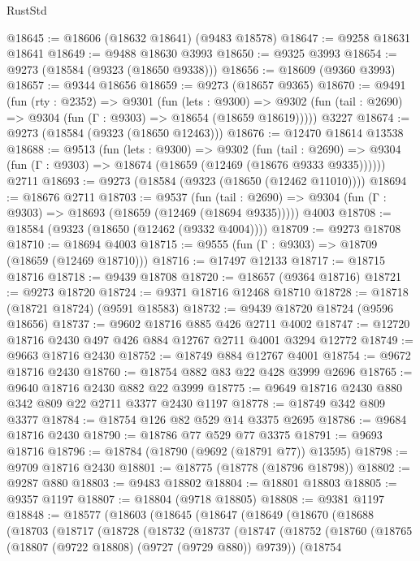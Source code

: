 \begin{lexlean}{RustStd}
\begin{coremodule}
@18645 := @18606 (@18632 @18641) (@9483 @18578)
@18647 := @9258 @18631 @18641
@18649 := @9488 @18630 @3993
@18650 := @9325 @3993
@18654 := @9273 (@18584 (@9323 (@18650 @9338)))
@18656 := @18609 (@9360 @3993)
@18657 := @9344 @18656
@18659 := @9273 (@18657 @9365)
@18670 := @9491
    (fun (rty : @2352) =>
    @9301
      (fun (lets : @9300) =>
      @9302 (fun (tail : @2690) => @9304 (fun (Γ : @9303) => @18654 (@18659 @18619)))))
    @3227
@18674 := @9273 (@18584 (@9323 (@18650 @12463)))
@18676 := @12470 @18614 @13538
@18688 := @9513
    (fun (lets : @9300) =>
    @9302
      (fun (tail : @2690) =>
      @9304 (fun (Γ : @9303) => @18674 (@18659 (@12469 (@18676 @9333 @9335))))))
    @2711
@18693 := @9273 (@18584 (@9323 (@18650 (@12462 @11010))))
@18694 := @18676 @2711
@18703 := @9537
    (fun (tail : @2690) => @9304 (fun (Γ : @9303) => @18693 (@18659 (@12469 (@18694 @9335)))))
    @4003
@18708 := @18584 (@9323 (@18650 (@12462 (@9332 @4004))))
@18709 := @9273 @18708
@18710 := @18694 @4003
@18715 := @9555 (fun (Γ : @9303) => @18709 (@18659 (@12469 @18710)))
@18716 := @17497 @12133
@18717 := @18715 @18716
@18718 := @9439 @18708
@18720 := @18657 (@9364 @18716)
@18721 := @9273 @18720
@18724 := @9371 @18716 @12468 @18710
@18728 := @18718 (@18721 @18724) (@9591 @18583)
@18732 := @9439 @18720 @18724 (@9596 @18656)
@18737 := @9602 @18716 @885 @426 @2711 @4002
@18747 := @12720 @18716 @2430 @497 @426 @884 @12767 @2711 @4001 @3294 @12772
@18749 := @9663 @18716 @2430
@18752 := @18749 @884 @12767 @4001
@18754 := @9672 @18716 @2430
@18760 := @18754 @882 @83 @22 @428 @3999 @2696
@18765 := @9640 @18716 @2430 @882 @22 @3999
@18775 := @9649 @18716 @2430 @880 @342 @809 @22 @2711 @3377 @2430 @1197
@18778 := @18749 @342 @809 @3377
@18784 := @18754 @126 @82 @529 @14 @3375 @2695
@18786 := @9684 @18716 @2430
@18790 := @18786 @77 @529 @77 @3375
@18791 := @9693 @18716
@18796 := @18784 (@18790 (@9692 (@18791 @77)) @13595)
@18798 := @9709 @18716 @2430
@18801 := @18775 (@18778 (@18796 @18798))
@18802 := @9287 @880
@18803 := @9483 @18802
@18804 := @18801 @18803
@18805 := @9357 @1197
@18807 := @18804 (@9718 @18805)
@18808 := @9381 @1197
@18848 := @18577
    (@18603
      (@18645
        (@18647
          (@18649
            (@18670
              (@18688
                (@18703
                  (@18717
                    (@18728
                      (@18732
                        (@18737
                          (@18747
                            (@18752
                              (@18760
                                (@18765 (@18807 (@9722 @18808) (@9727 (@9729 @880)) @9739))
                                (@18754

\end{coremodule}
\end{lexlean}
